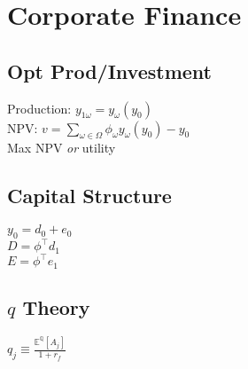 \section{Corporate Finance}
	\subsection*{Opt Prod/Investment}
	Production: $y_{1\omega} = y_{\omega}\left(y_{0}\right)$\\
	NPV: $v = \sum_{\omega\in\Omega}\phi_{\omega}y_{\omega}\left(y_{0}\right) - y_{0}$\\
	Max NPV \emph{or} utility
	
	\subsection*{Capital Structure}
	$y_{0} = d_{0} + e_{0}$\\
	$D = \phi^{\intercal}d_{1}$\\
	$E = \phi^{\intercal}e_{1}$
	
	\subsection*{$q$ Theory}
	$q_{j}\equiv\frac{\mathbb{E}^{\mathbb{Q}}\left[A_{j}\right]}{1 + r_{f}}$
	